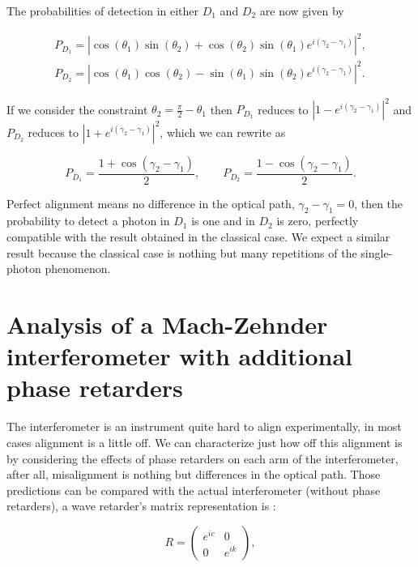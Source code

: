 \documentclass[12pt]{book}
\begin{document}
The probabilities of detection in either $D_{1}$ and $D_{2}$ are now given by

\begin{align}
P_{D_{1}}=|\cos(\theta_{1})\sin(\theta_{2})+\cos(\theta_{2})\sin(\theta_{1})e^{i(\gamma_{2}-\gamma_{1})}|^{2},\label{newergraph}\\
P_{D_{2}}=|\cos(\theta_{1})\cos(\theta_{2})-\sin(\theta_{1})\sin(\theta_{2})e^{i(\gamma_{2}-\gamma_{1})}|^{2}. \label{newgraph}
\end{align}

If we consider the constraint $\theta_{2}=\frac{\pi}{2}-\theta_{1}$ then $P_{D_{1}}$ reduces to $|1-e^{i(\gamma_{2}-\gamma_{1})}|^{2}$ and $P_{D_{2}}$ reduces to $|1+e^{i(\gamma_{2}-\gamma_{1})}|^{2}$, which we can rewrite as

\begin{equation}
P_{D_{1}}=\frac{1+\cos(\gamma_{2}-\gamma_{1})}{2}, \qquad P_{D_{2}}=\frac{1-\cos(\gamma_{2}-\gamma_{1})}{2}. \label{pp_wheler}
\end{equation}

Perfect alignment means no difference in the optical path, $\gamma_{2}-\gamma_{1}=0$, then the probability to detect a photon in $D_{1}$ is one and in $D_{2}$ is zero, perfectly compatible with the result obtained in the classical case. We expect a similar result because the classical case is nothing but many repetitions of the single-photon phenomenon.

\section[Analysis with phase retarders]{Analysis of a Mach-Zehnder interferometer with additional phase retarders}

The interferometer is an instrument quite hard to align experimentally, in most cases alignment is a little off. We can characterize just how off this alignment is by considering the effects of phase retarders on each arm of the interferometer, after all, misalignment is nothing but differences in the optical path. Those predictions can be compared with the actual interferometer (without phase retarders), a wave retarder's  matrix representation is :


\begin{equation}
 R=\begin
{pmatrix} e^
{i c} & 0\\0& e^
{i k }\end
{pmatrix},
\end{equation}
\end{document}
